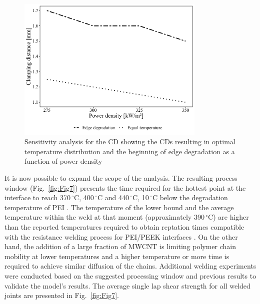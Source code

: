 \documentclass[review,times,sagev,doublespace]{sagej}
\begin{document}
\begin{figure}[ht]
	\center
	\includegraphics[width=90mm]{Fig6}
	\caption{Sensitivity analysis for the {CD} showing the {CDs} resulting in optimal temperature distribution and the beginning of edge degradation as a function of power density \cite{Brassard2019b}}
	\label{fig:Fig6}
\end{figure} 

It is now possible to expand the scope of the analysis. 
The resulting process window (\mbox{Fig.~\ref{fig:Fig7}}) presents the time required for the hottest point at the interface to reach \mbox{370\,$^{\circ}$C}, \mbox{400\,$^{\circ}$C} and \mbox{440\,$^{\circ}$C}, \mbox{10\,$^{\circ}$C} below the degradation temperature of PEI \cite{Carroccio2000}. 
The temperature of the lower bound and the average temperature within the weld at that moment (approximately \mbox{390\,$^{\circ}$C}) are higher than the reported temperatures required to obtain reptation times compatible with the resistance welding process for PEI/PEEK interfaces \cite{Bastien1991}. 
On the other hand, the addition of a large fraction of MWCNT is limiting polymer chain mobility at lower temperatures \cite{Mu2009,Kabanemi2010} and a higher temperature or more time is required to achieve similar diffusion of the chains. 
Additional welding experiments were conducted based on the suggested processing window and previous results to validate the model’s results. 
The average single lap shear strength for all welded joints are presented in \mbox{Fig.~\ref{fig:Fig7}}.  
\end{document}
